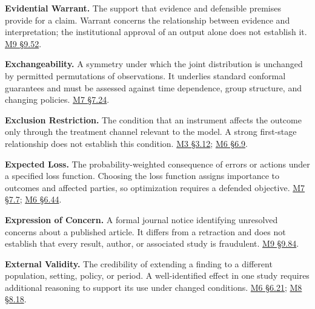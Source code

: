 \noindent\textbf{Evidential Warrant.} The support that evidence and defensible
premises provide for a claim. Warrant concerns the relationship between
evidence and interpretation; the institutional approval of an output
alone does not establish it.
\hyperref[M09-truth-warrant-and-the-different-force-of-norms]{M9
§9.52}.

\noindent\textbf{Exchangeability.} A symmetry under which the joint distribution
is unchanged by permitted permutations of observations. It underlies
standard conformal guarantees and must be assessed against time
dependence, group structure, and changing policies.
\href{Marketing_Analytics_Lecture_Notes.pdf\#M07-demand-intervals-and-the-distribution-of-forecast-errors}{M7
§7.24}.

\noindent\textbf{Exclusion Restriction.} The condition that an instrument affects
the outcome only through the treatment channel relevant to the model. A
strong first-stage relationship does not establish this condition.
\href{Marketing_Analytics_Lecture_Notes.pdf\#M03-price-elasticity-when-prices-respond-to-demand}{M3
§3.12};
\href{Marketing_Analytics_Lecture_Notes.pdf\#M06-other-designs-discontinuities-and-instruments}{M6
§6.9}.

\noindent\textbf{Expected Loss.} The probability-weighted consequence of errors
or actions under a specified loss function. Choosing the loss function
assigns importance to outcomes and affected parties, so optimization
requires a defended objective.
\href{Marketing_Analytics_Lecture_Notes.pdf\#M07-thresholds-should-reflect-the-decision}{M7
§7.7};
\href{Marketing_Analytics_Lecture_Notes.pdf\#M06-type-i-and-type-ii-errors-under-unequal-costs}{M6
§6.44}.

\noindent\textbf{Expression of Concern.} A formal journal notice identifying
unresolved concerns about a published article. It differs from a
retraction and does not establish that every result, author, or
associated study is fraudulent.
\hyperref[M09-misleading-research-replication-and-correction]{M9
§9.84}.

\noindent\textbf{External Validity.} The credibility of extending a finding to a
different population, setting, policy, or period. A well-identified
effect in one study requires additional reasoning to support its use
under changed conditions.
\href{Marketing_Analytics_Lecture_Notes.pdf\#M06-experimental-evidence-and-ai-assisted-decisions}{M6
§6.21};
\href{Marketing_Analytics_Lecture_Notes.pdf\#M08-model-updates-and-the-decision-to-revisit-an-analysis}{M8
§8.18}.

